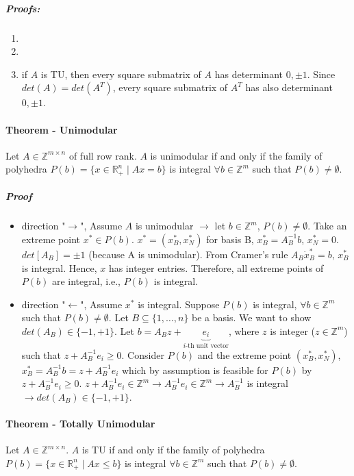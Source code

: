\documentclass[main]{subfiles}
\begin{document}
\subparagraph{Proofs:}
\begin{enumerate}
\item {}
\item {}
\item if $A$ is TU, then every square submatrix of $A$ has determinant $0, \pm
1$. Since $det(A) = det(A^T)$, every square submatrix of $A^T$ has also
determinant $0, \pm 1$.
\end{enumerate}

\paragraph{Theorem - Unimodular}
Let $A \in \mathbb{Z}^{m \times n}$ of full row rank. $A$ is unimodular if and
only if the family of polyhedra $P(b) = \{ x \in \mathbb{R}^{n}_+ \mid Ax = b
\}$ is integral $\forall b \in \mathbb{Z}^{m}$ such that $P(b) \neq \emptyset$.

\subparagraph{Proof}
\begin{itemize}
\item direction "$\rightarrow$", Assume $A$ is unimodular $\rightarrow$ let $b
\in \mathbb{Z}^{m}$, $P(b) \neq \emptyset$. Take an extreme point $x^{*} \in
P(b)$. $x^{*} = (x^{*}_{B}, x^{*}_{N})$ for basis B, $x^{*}_{B} = A^{-1}_{B}b$,
$x^{*}_{N} = 0$.\\
$det[A_{B}] = \pm 1$ (because A is unimodular). From Cramer's rule $A_{B} \dot
x^{*}_{B} = b$, $x^{*}_{B}$ is integral. Hence, $x$ has integer entries.
Therefore, all extreme points of $P(b)$ are integral, i.e., $P(b)$ is integral.

\item direction "$\leftarrow$", Assume $x^{*}$ is integral. Suppose $P(b)$ is
integral, $\forall b \in \mathbb{Z}^{m}$ such that $P(b) \neq \emptyset$. Let
$B \subseteq \{1, \dots, n\}$ be a basis. We want to show $det(A_{B}) \in \{-1,
+1\}$.
Let $b = A_{B}z + \underbrace{e_{i}}_{\text{$i$-th unit vector}}$, where $z$ is
integer ($z \in \mathbb{Z}^{m}$) such that $z + A^{-1}_{B} e_{i} \geq 0$.
Consider $P(b)$ and the extreme point $(x^{*}_{B}, x^{*}_{N})$, $x^{*}_{B} =
A^{-1}_{B}b = z + A^{-1}_{B} e_{i}$ which by assumption is feasible for $P(b)$
by $z + A^{-1}_{B} e_{i} \geq 0$. $z + A^{-1}_{B} e_{i} \in \mathbb{Z}^{m}
\rightarrow A^{-1}_{B} e_{i} \in \mathbb{Z}^{m} \rightarrow A^{-1}_{B}$ is
integral $\rightarrow det(A_{B}) \in \{-1, +1\}$.
\end{itemize}

\paragraph{Theorem - Totally Unimodular}
Let $A \in \mathbb{Z}^{m \times n}$. $A$ is TU if and only if the family of
polyhedra $P(b) = \{ x \in \mathbb{R}^{n}_+ \mid Ax \leq b \}$ is integral
$\forall b \in \mathbb{Z}^{m}$ such that $P(b) \neq \emptyset$.
\end{document}
